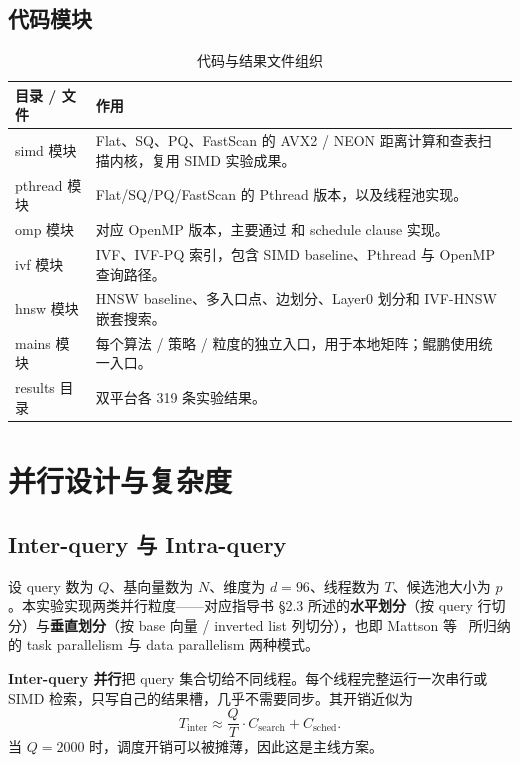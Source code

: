\documentclass[a4paper,11pt,UTF8]{ctexart}
\newcommand{\code}[1]{\texttt{\detokenize{#1}}}
\begin{document}
\subsection{代码模块}

\begin{table}[H]
  \centering\small
  \begin{tabularx}{\textwidth}{p{2.9cm}Y}
    \toprule
    目录 / 文件 & 作用 \\
    \midrule
    simd 模块 & Flat、SQ、PQ、FastScan 的 AVX2 / NEON 距离计算和查表扫描内核，复用 SIMD 实验成果。\\
    pthread 模块 & Flat/SQ/PQ/FastScan 的 Pthread 版本，以及线程池实现。\\
    omp 模块 & 对应 OpenMP 版本，主要通过 \code{parallel for} 和 schedule clause 实现。\\
    ivf 模块 & IVF、IVF-PQ 索引，包含 SIMD baseline、Pthread 与 OpenMP 查询路径。\\
    hnsw 模块 & HNSW baseline、多入口点、边划分、Layer0 划分和 IVF-HNSW 嵌套搜索。\\
    mains 模块 & 每个算法 / 策略 / 粒度的独立入口，用于本地矩阵；鲲鹏使用统一入口。\\
    results 目录 & 双平台各 319 条实验结果。\\
    \bottomrule
  \end{tabularx}
  \caption{代码与结果文件组织}
  \label{tab:modules}
\end{table}

\section{并行设计与复杂度}

\subsection{Inter-query 与 Intra-query}

设 query 数为 $Q$、基向量数为 $N$、维度为 $d=96$、线程数为 $T$、候选池大小为 $p$。本实验实现两类并行粒度——对应指导书 §2.3 所述的\textbf{水平划分}（按 query 行切分）与\textbf{垂直划分}（按 base 向量 / inverted list 列切分），也即 Mattson 等~\cite{mattson2004patterns} 所归纳的 task parallelism 与 data parallelism 两种模式。

\textbf{Inter-query 并行}把 query 集合切给不同线程。每个线程完整运行一次串行或 SIMD 检索，只写自己的结果槽，几乎不需要同步。其开销近似为
\[
T_{\mathrm{inter}}\approx \frac{Q}{T}\cdot C_{\mathrm{search}} + C_{\mathrm{sched}} .
\]
当 $Q=2000$ 时，调度开销可以被摊薄，因此这是主线方案。
\end{document}
